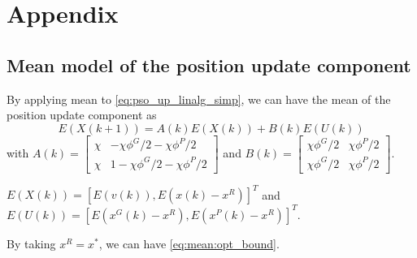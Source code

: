 \section{Appendix}

\subsection{Mean model of the position update component}
\label{app:mean_pso}

By applying mean to \eqref{eq:pso_up_linalg_simp}, we can have the mean of the position update component as
\begin{equation}
\label{eq:pso_up_linalg_simp:mean}
E( X(k+1) ) = A(k) E( X(k) ) + B(k) E( U(k) )
\end{equation}
with
$ A(k) = \begin{bmatrix}
\chi & - \chi \phi^{G}/2 - \chi \phi^{P}/2
\\ 
\chi & 1 - \chi \phi^{G}/2 - \chi \phi^{P}/2
\end{bmatrix} $
and
$ B(k) = \begin{bmatrix}
\chi \phi^{G}/2 & \chi \phi^{P}/2
\\ 
\chi \phi^{G}/2 & \chi \phi^{P}/2
\end{bmatrix} $.

$ E( X(k) ) = [ E( v(k) ), E( x(k) - x^{R} ) ]^{T} $ and $ E( U(k) ) = [ E( x^{G}(k) - x^{R} ) , E( x^{P}(k) - x^{R} ) ]^{T} $.

By taking $ x^{R} = x^{*} $, we can have \eqref{eq:mean:opt_bound}.
